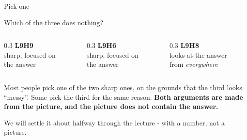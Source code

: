 \documentclass[aspectratio=169]{beamer}
\newcommand{\trapbox}[1]{%
  \begin{tcolorbox}[colback=armred!8, colframe=armred, boxrule=0.6pt, arc=2pt]
  #1
  \end{tcolorbox}}
\begin{document}
\begin{frame}{Pick one}
  \vspace{1.1em}
  \begin{center}
    {\large Which of the three does nothing?}
  \end{center}

  \vspace{1.2em}
  \begin{columns}[T]
    \begin{column}{0.3\textwidth}
      \centering\textbf{L9H9}\\[0.4em]
      {\footnotesize sharp, focused on\\the answer}
    \end{column}
    \begin{column}{0.3\textwidth}
      \centering\textbf{L9H6}\\[0.4em]
      {\footnotesize sharp, focused on\\the answer}
    \end{column}
    \begin{column}{0.3\textwidth}
      \centering\textbf{L9H8}\\[0.4em]
      {\footnotesize looks at the answer\\from \emph{everywhere}}
    \end{column}
  \end{columns}

  \vspace{1.4em}
  \pause
  \trapbox{Most people pick one of the two sharp ones, on the grounds that the third looks
  ``messy''. Some pick the third for the same reason. \textbf{Both arguments are made from the
  picture, and the picture does not contain the answer.}}

  \vspace{0.5em}
  {\footnotesize We will settle it about halfway through the lecture - with a number, not a
  picture.}
\end{frame}
\end{document}
